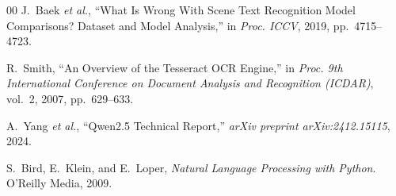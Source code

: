 \documentclass[conference]{IEEEtran}
\begin{document}
\begin{thebibliography}{00}
J.~Baek \textit{et al.}, ``What Is Wrong With Scene Text Recognition Model
Comparisons? Dataset and Model Analysis,'' in \textit{Proc. ICCV}, 2019,
pp.~4715--4723.

R.~Smith, ``An Overview of the Tesseract OCR Engine,'' in \textit{Proc.
9th International Conference on Document Analysis and Recognition (ICDAR)},
vol.~2, 2007, pp.~629--633.

A.~Yang \textit{et al.}, ``Qwen2.5 Technical Report,'' \textit{arXiv
preprint arXiv:2412.15115}, 2024.

S.~Bird, E.~Klein, and E.~Loper, \textit{Natural Language Processing with
Python}. O'Reilly Media, 2009.

\end{thebibliography}
\end{document}
